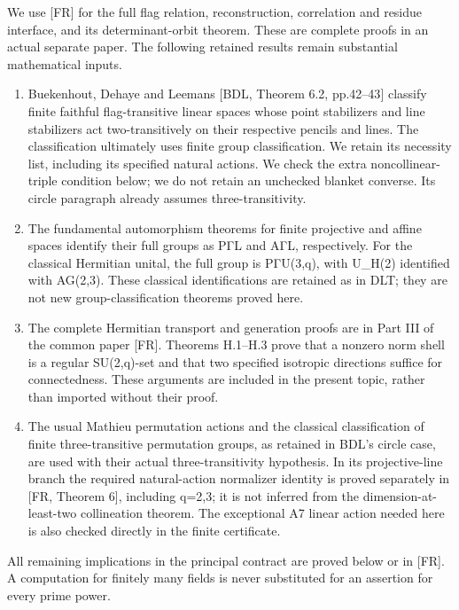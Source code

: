 \documentclass[
  11pt,
  a4paper,
]{article}
\providecommand{\tightlist}{%
  \setlength{\itemsep}{0pt}\setlength{\parskip}{0pt}}
\begin{document}
We use {[}FR{]} for the full flag relation, reconstruction, correlation
and residue interface, and its determinant-orbit theorem. These are
complete proofs in an actual separate paper. The following retained
results remain substantial mathematical inputs.

\begin{enumerate}
\def\labelenumi{\arabic{enumi}.}
\tightlist
\item
  Buekenhout, Dehaye and Leemans {[}BDL, Theorem 6.2, pp.42--43{]}
  classify finite faithful flag-transitive linear spaces whose point
  stabilizers and line stabilizers act two-transitively on their
  respective pencils and lines. The classification ultimately uses
  finite group classification. We retain its necessity list, including
  its specified natural actions. We check the extra noncollinear-triple
  condition below; we do not retain an unchecked blanket converse. Its
  circle paragraph already assumes three-transitivity.
\item
  The fundamental automorphism theorems for finite projective and affine
  spaces identify their full groups as PΓL and AΓL, respectively. For
  the classical Hermitian unital, the full group is PΓU(3,q), with
  U\_H(2) identified with AG(2,3). These classical identifications are
  retained as in DLT; they are not new group-classification theorems
  proved here.
\item
  The complete Hermitian transport and generation proofs are in
  Part III of the common paper [FR]. Theorems H.1--H.3 prove that a
  nonzero norm shell is a regular SU(2,q)-set and that two specified
  isotropic directions suffice for connectedness. These arguments are
  included in the present topic, rather than imported without their proof.
\item
  The usual Mathieu permutation actions and the classical classification
  of finite three-transitive permutation groups, as retained in BDL's
  circle case, are used with their actual three-transitivity hypothesis.
  In its projective-line branch the required natural-action normalizer
  identity is proved separately in {[}FR, Theorem 6{]}, including q=2,3;
  it is not inferred from the dimension-at-least-two collineation
  theorem. The exceptional A7 linear action needed here is also checked
  directly in the finite certificate.
\end{enumerate}

All remaining implications in the principal contract are proved below or
in {[}FR{]}. A computation for finitely many fields is never substituted
for an assertion for every prime power.
\end{document}

